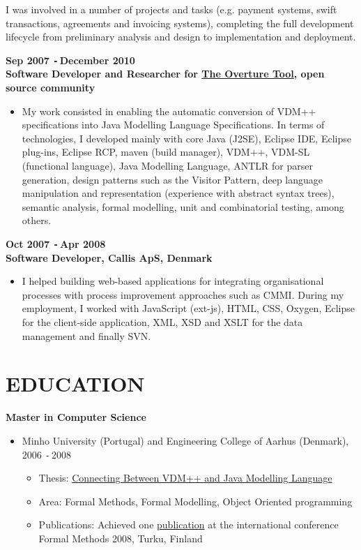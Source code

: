 \documentclass{res}
\def\Minus{\texttt{-}\,}
\begin{document}
\begin{resume}
\begin{itemize}
        I was involved in a number of projects and tasks (e.g. payment systems, swift transactions, agreements and invoicing systems), completing the full development lifecycle from preliminary analysis and design to implementation and deployment.
       \end{itemize}

  {\bf Sep 2007 \Minus December 2010}\\
  {\bf Software Developer and Researcher for \href{http://www.overturetool.org}{The Overture Tool}, open source community}
        \begin{itemize}
        \item[] My work consisted in enabling the automatic conversion of VDM++ specifications into Java Modelling Language Specifications. In terms of technologies, I developed mainly with core Java (J2SE), Eclipse IDE, Eclipse plug-ins, Eclipse RCP, maven (build manager), VDM++, VDM-SL (functional language), Java Modelling Language, ANTLR for parser generation, design patterns such as the Visitor Pattern, deep language manipulation and representation (experience with abstract syntax trees), semantic analysis, formal modelling, unit and combinatorial testing, among others.
       \end{itemize}

  {\bf Oct 2007 \Minus Apr 2008}\\
  {\bf Software Developer, Callis ApS, Denmark}
        \begin{itemize}
        \item[] I helped building web-based applications for integrating organisational processes with process improvement approaches such as CMMI.
During my employment, I worked with JavaScript (ext-js), HTML, CSS, Oxygen, Eclipse for the client-side application, XML, XSD and XSLT for the data management and finally SVN.
        \end{itemize}

\section{EDUCATION}
\vspace{0.1in}

    {\bf Master in Computer Science}
    \begin{itemize}
      \item[] Minho University (Portugal) and Engineering College of Aarhus (Denmark), 2006 \Minus 2008
      \begin{itemize}
        \item Thesis: \href{http://wiki.overturetool.org/images/4/44/ConnectingVDMppJML.pdf}{Connecting Between VDM++ and Java Modelling Language}
        \item Area: Formal Methods, Formal Modelling, Object Oriented programming
        \item Publications: Achieved one \href{http://www.cs.ncl.ac.uk/publications/trs/papers/1099.pdf}{publication} at the international conference Formal Methods 2008, Turku, Finland
      \end{itemize}
    \end{itemize}


\end{resume}
\end{document}

